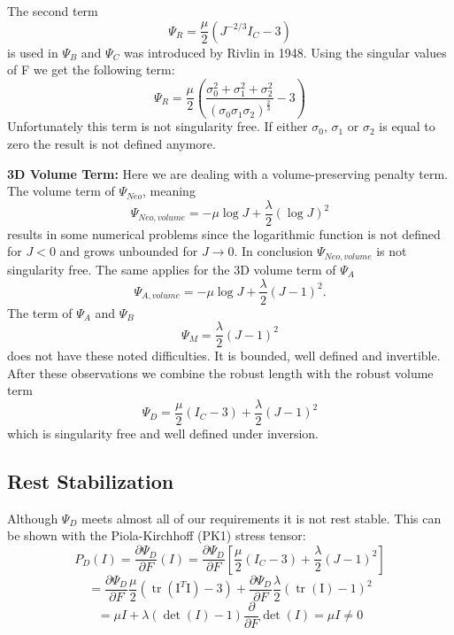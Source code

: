The second term 
\[
\Psi_{R} = \frac{\mu}{2}\left(J^{-2 / 3} I_{C}-3\right)
\]
is used in $\Psi_{B}$ and $\Psi_{C}$ was introduced by Rivlin in 1948. Using the singular values of F we get the following term:
\[
\Psi_{R} = \frac{\mu}{2}\left(\frac{\sigma_{0}^2 + \sigma_{1}^2 + \sigma_{2}^2}{(\sigma_{0}  \sigma_{1}  \sigma_{2})^\frac{2}{3}}
 - 3\right)
\]
Unfortunately this term is not singularity free. If either $\sigma_{0}$, $\sigma_{1}$ or $\sigma_{2}$ is equal to zero the result is not defined anymore.


\textbf{3D Volume Term:} Here we are dealing with a volume-preserving penalty term. The volume term of $\Psi_{Neo}$, meaning
\[
\Psi_{Neo, volume} = -\mu \log J+\frac{\lambda}{2}(\log J)^{2}
\]
results in some numerical problems since the logarithmic function is not defined for $J<0$ and grows unbounded for $J \rightarrow 0$. In conclusion $\Psi_{Neo, volume}$ is not singularity free. 
The same applies for the 3D volume term of $\Psi_{A}$
\[
\Psi_{A, volume} = -\mu \log J+\frac{\lambda}{2}(J-1)^{2}.
\]
The term of $\Psi_{A}$ and $\Psi_{B}$
\[
\Psi_{M} = \frac{\lambda}{2}(J-1)^{2}
\]
does not have these noted difficulties. It is bounded, well defined and invertible. After these observations we combine the robust length with the robust volume term
\[
\Psi_{D} = \frac{\mu}{2}\left(I_{C}-3\right) +\frac{\lambda}{2}(J-1)^{2}
\]
which is singularity free and well defined under inversion.


\subsection{Rest Stabilization}
Although $\Psi_{D}$ meets almost all of our requirements it is not rest stable. This can be shown with the Piola-Kirchhoff (PK1) stress tensor:
\[
P_{D}(I) = \frac{\partial \Psi_{D}}{\partial F} (I) = \frac{\partial \Psi_{D}}{\partial F} \left[ \frac{\mu}{2}\left(I_{C}-3\right) +\frac{\lambda}{2}(J-1)^{2} \right]
\]
\[
= \frac{\partial \Psi_{D}}{\partial F}  \frac{\mu}{2}\left(\operatorname{tr}(\mathrm{I}^{T} \mathrm{I})-3\right) +\frac{\partial \Psi_{D}}{\partial F} \frac{\lambda}{2}(\operatorname{tr}(\mathrm{I})-1)^{2}
\]
\[
= \mu I + \lambda (\operatorname{det}(I)-1)  \frac{\partial}{\partial F} \operatorname{det}(I) = \mu I \neq 0
\]

